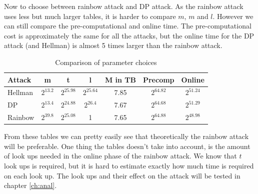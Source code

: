 Now to choose between rainbow attack and DP attack. As the rainbow attack
uses less but much larger tables, it is harder to compare $m$, $m$ and
$l$. However we can still compare the pre-computational and online time. The
pre-computational cost is approximately the same for all the attacks,
but the online time for the DP attack (and Hellman) is almost 5 times larger than
the rainbow attack.
\begin{table}[H]
  \centering
  \begin{tabular}{|l|cccccc}
    \hline
    \rowcolor[HTML]{EFEFEF}
    Attack  & \multicolumn{1}{c|}{\cellcolor[HTML]{EFEFEF}m} & \multicolumn{1}{c|}{\cellcolor[HTML]{EFEFEF}t} & \multicolumn{1}{c|}{\cellcolor[HTML]{EFEFEF}l} & \multicolumn{1}{c|}{\cellcolor[HTML]{EFEFEF}M in TB} & \multicolumn{1}{c|}{\cellcolor[HTML]{EFEFEF}Precomp} & \multicolumn{1}{c|}{\cellcolor[HTML]{EFEFEF}Online} \\ \hline
    Hellman & $2^{13.2}$                                     & $2^{25.98}$                                    & $2^{25.64}$                                    & 7.85                                                 & $2^{64.82}$                                          & $2^{51.24}$                                         \\ \cline{1-1}
    \rowcolor[HTML]{EFEFEF}
    DP      & $2^{13.4}$                                     & $2^{24.88}$                                    & $2^{26.4}$                                     & 7.67                                                 & $2^{64.68}$                                          & $2^{51.29}$                                         \\
    Rainbow & $2^{39.8}$                                     & $2^{25.08}$                                    & 1                                              & 7.65                                                 & $2^{64.88}$                                          & $2^{48.98}$                                         \\ \cline{1-1}
  \end{tabular}
  \caption{Comparison of parameter choices}
  \label{tab:compare}
\end{table}

From these tables we can pretty easily see that theoretically the rainbow attack
will be preferable. One thing the tables doesn't take into
account, is the amount of look ups needed in the online phase of the
rainbow attack. We know that $t$ look ups is required, but it is hard
to estimate exactly how much time is required on each look up. The
look ups and their effect on the attack will be tested in chapter \ref{ch:anal}.



